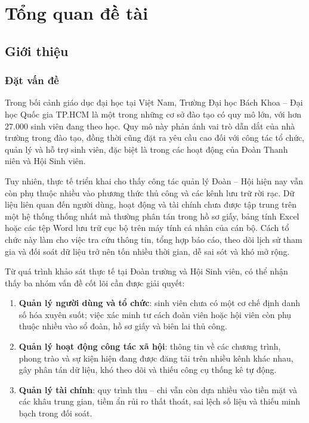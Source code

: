 \section{Tổng quan đề tài}
\subsection{Giới thiệu}

\subsubsection{Đặt vấn đề}
Trong bối cảnh giáo dục đại học tại Việt Nam, Trường Đại học Bách Khoa -- Đại học Quốc gia TP.HCM là một trong những cơ sở đào tạo có quy mô lớn, với hơn 27.000 sinh viên đang theo học. Quy mô này phản ánh vai trò dẫn dắt của nhà trường trong đào tạo, đồng thời cũng đặt ra yêu cầu cao đối với công tác tổ chức, quản lý và hỗ trợ sinh viên, đặc biệt là trong các hoạt động của Đoàn Thanh niên và Hội Sinh viên.

Tuy nhiên, thực tế triển khai cho thấy công tác quản lý Đoàn -- Hội hiện nay vẫn còn phụ thuộc nhiều vào phương thức thủ công và các kênh lưu trữ rời rạc. Dữ liệu liên quan đến người dùng, hoạt động và tài chính chưa được tập trung trên một hệ thống thống nhất mà thường phân tán trong hồ sơ giấy, bảng tính Excel hoặc các tệp Word lưu trữ cục bộ trên máy tính cá nhân của cán bộ. Cách tổ chức này làm cho việc tra cứu thông tin, tổng hợp báo cáo, theo dõi lịch sử tham gia và đối soát dữ liệu trở nên tốn nhiều thời gian, dễ sai sót và khó mở rộng.

Từ quá trình khảo sát thực tế tại Đoàn trường và Hội Sinh viên, có thể nhận thấy ba nhóm vấn đề cốt lõi cần được giải quyết:

\begin{enumerate}
	\item \textbf{Quản lý người dùng và tổ chức}: sinh viên chưa có một cơ chế định danh số hóa xuyên suốt; việc xác minh tư cách đoàn viên hoặc hội viên còn phụ thuộc nhiều vào sổ đoàn, hồ sơ giấy và biên lai thủ công.
	\item \textbf{Quản lý hoạt động công tác xã hội}: thông tin về các chương trình, phong trào và sự kiện hiện đang được đăng tải trên nhiều kênh khác nhau, gây phân tán dữ liệu, khó theo dõi và thiếu công cụ thống kê tự động.
	\item \textbf{Quản lý tài chính}: quy trình thu -- chi vẫn còn dựa nhiều vào tiền mặt và các khâu trung gian, tiềm ẩn rủi ro thất thoát, sai lệch số liệu và thiếu minh bạch trong đối soát.
\end{enumerate}

